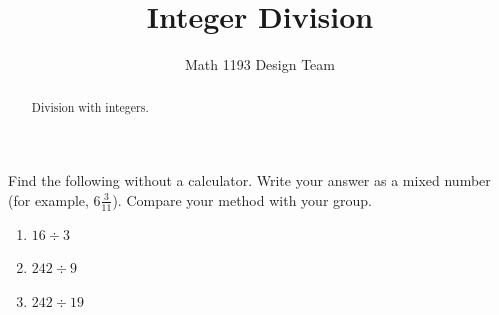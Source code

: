 \documentclass[noauthor]{ximera}
\title{Integer Division}
\author{Math 1193 Design Team}
\begin{document}
\begin{abstract}
    Division with integers.
\end{abstract}
\maketitle

Find the following without a calculator. Write your answer as a 
mixed number (for example, \(6 \frac{3}{11}\)). Compare your method 
with your group.

\begin{enumerate}
    \item \(16 \div 3\)
    \item \(242 \div 9\)
    \item \(242 \div 19\)
\end{enumerate}
\end{document}

